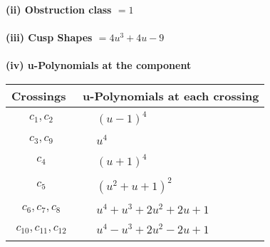\documentclass[1p]{elsarticle_modified}
\theoremstyle{definition}
\begin{document}
\flushleft \textbf{(ii) Obstruction class $= 1$}\\~\\
\flushleft \textbf{(iii) Cusp Shapes $= 4 u^3+4 u-9$}\\~\\
\newpage\renewcommand{\arraystretch}{1}
\flushleft \textbf{(iv) u-Polynomials at the component}\newline \\
\begin{tabular}{m{50pt}|m{274pt}}
Crossings & \hspace{64pt}u-Polynomials at each crossing \\
\hline $$\begin{aligned}c_{1},c_{2}\end{aligned}$$&$\begin{aligned}
&(u-1)^4
\end{aligned}$\\
\hline $$\begin{aligned}c_{3},c_{9}\end{aligned}$$&$\begin{aligned}
&u^4
\end{aligned}$\\
\hline $$\begin{aligned}c_{4}\end{aligned}$$&$\begin{aligned}
&(u+1)^4
\end{aligned}$\\
\hline $$\begin{aligned}c_{5}\end{aligned}$$&$\begin{aligned}
&(u^2+u+1)^2
\end{aligned}$\\
\hline $$\begin{aligned}c_{6},c_{7},c_{8}\end{aligned}$$&$\begin{aligned}
&u^4+u^3+2 u^2+2 u+1
\end{aligned}$\\
\hline $$\begin{aligned}c_{10},c_{11},c_{12}\end{aligned}$$&$\begin{aligned}
&u^4- u^3+2 u^2-2 u+1
\end{aligned}$\\
\hline
\end{tabular}\\~\\
\end{document}
